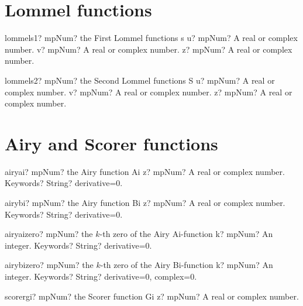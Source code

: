 \documentclass[12pt,a4paper,openany]{book}
\begin{document}
\section{Lommel functions}

\begin{mpFunctionsExtract}
\mpFunctionThree
{lommels1? mpNum? the First Lommel functions s}
{u? mpNum? A real or complex number.}
{v? mpNum? A real or complex number.}
{z? mpNum? A real or complex number.}
\end{mpFunctionsExtract}

\begin{mpFunctionsExtract}
\mpFunctionThree
{lommels2? mpNum? the Second Lommel functions S}
{u? mpNum? A real or complex number.}
{v? mpNum? A real or complex number.}
{z? mpNum? A real or complex number.}
\end{mpFunctionsExtract}

\section{Airy and Scorer functions}

\begin{mpFunctionsExtract}
\mpFunctionTwo
{airyai? mpNum? the Airy function Ai}
{z? mpNum? A real or complex number.}
{Keywords? String? derivative=0.}
\end{mpFunctionsExtract}

\begin{mpFunctionsExtract}
\mpFunctionTwo
{airybi? mpNum? the Airy function Bi}
{z? mpNum? A real or complex number.}
{Keywords? String? derivative=0.}
\end{mpFunctionsExtract}

\begin{mpFunctionsExtract}
\mpFunctionTwo
{airyaizero? mpNum? the $k$-th zero of the Airy Ai-function}
{k? mpNum? An integer.}
{Keywords? String? derivative=0.}
\end{mpFunctionsExtract}

\begin{mpFunctionsExtract}
\mpFunctionTwo
{airybizero? mpNum? the $k$-th zero of the Airy Bi-function}
{k? mpNum? An integer.}
{Keywords? String? derivative=0, complex=0.}
\end{mpFunctionsExtract}

\begin{mpFunctionsExtract}
\mpFunctionOne
{scorergi? mpNum? the Scorer function Gi}
{z? mpNum? A real or complex number.}
\end{mpFunctionsExtract}
\end{document}
